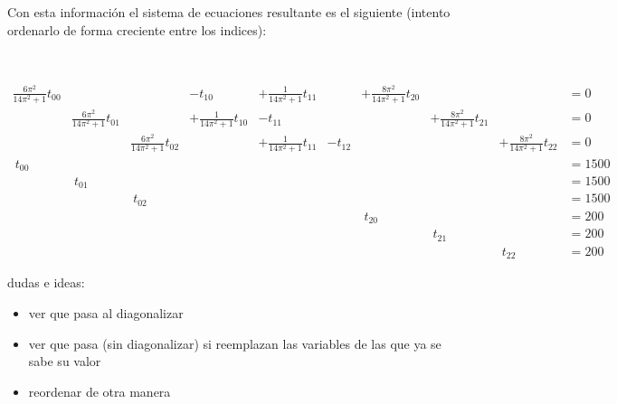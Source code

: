 \documentclass{article}
\begin{document}
\newpage

Con esta información el sistema de ecuaciones resultante es el siguiente (intento ordenarlo de forma creciente entre los indices):

\

{\tiny
\begin{align*}
    \frac{6\pi^2}{14\pi^2 + 1}t_{00}&&&-t_{10}&+\frac{1}{14\pi^2 + 1}t_{11}&&+\frac{8\pi^2}{14\pi^2 + 1}t_{20}&&&=0 \\
    &\frac{6\pi^2}{14\pi^2 + 1}t_{01}&&+\frac{1}{14\pi^2 + 1}t_{10}&-t_{11}&&&+\frac{8\pi^2}{14\pi^2 + 1}t_{21}&&=0 \\
    &&\frac{6\pi^2}{14\pi^2 + 1}t_{02}&&+\frac{1}{14\pi^2 + 1}t_{11}&-t_{12}&&&+\frac{8\pi^2}{14\pi^2 + 1}t_{22}&=0 \\
    ~t_{00}&&&&&&&&&=1500 \\
    &~t_{01}&&&&&&&&=1500 \\
    &&~t_{02}&&&&&&&=1500 \\
    &&&&&&~t_{20}&&&=200 \\
    &&&&&&&~t_{21}&&=200 \\
    &&&&&&&&~t_{22}&=200
\end{align*}
}

dudas e ideas:

\begin{itemize}
    \item ver que pasa al diagonalizar
    \item ver que pasa (sin diagonalizar) si reemplazan las variables de las que ya se sabe su valor
    \item reordenar de otra manera
\end{itemize}
\end{document}
